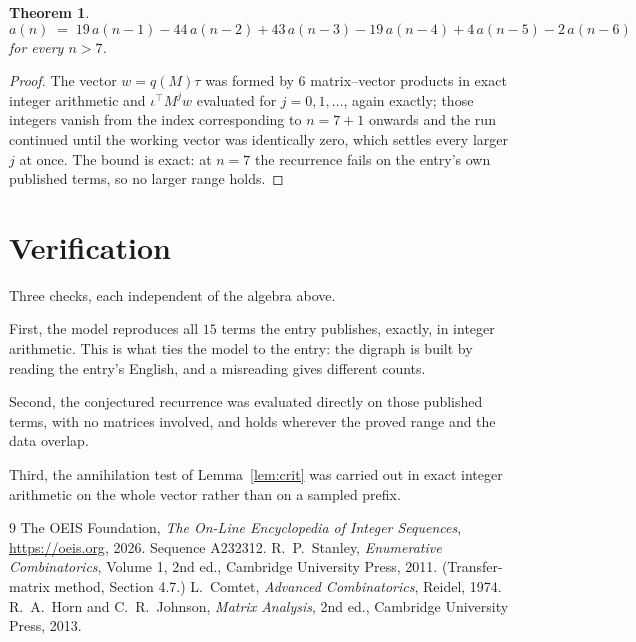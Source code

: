 \documentclass[11pt,a4paper]{article}
\theoremstyle{plain}
\newtheorem{theorem}{Theorem}
\theoremstyle{definition}
\begin{document}
\begin{theorem}
\[
a(n)\;=\;19\,a(n-1) - 44\,a(n-2) + 43\,a(n-3) - 19\,a(n-4) + 4\,a(n-5) - 2\,a(n-6)
\]
for every $n>7$.
\end{theorem}

\begin{proof}
The vector $w=q(M)\tau$ was formed by $6$ matrix--vector products in exact integer
arithmetic and $\iota^{\!\top}M^{j}w$ evaluated for $j=0,1,\dots$, again exactly; those
integers vanish from the index corresponding to $n=7+1$ onwards and the run continued
until the working vector was identically zero, which settles every larger $j$ at once. The bound is exact: at $n=7$ the recurrence fails on the entry's own published terms, so no larger range holds.
\end{proof}

\section{Verification}

Three checks, each independent of the algebra above.

First, the model reproduces all $15$ terms the entry publishes, exactly, in integer
arithmetic. This is what ties the model to the entry: the digraph is built by reading the
entry's English, and a misreading gives different counts.

Second, the conjectured recurrence was evaluated directly on those published terms, with no
matrices involved, and holds wherever the proved range and the data overlap.

Third, the annihilation test of Lemma~\ref{lem:crit} was carried out in exact integer
arithmetic on the whole vector rather than on a sampled prefix.

\begin{thebibliography}{9}
 The OEIS Foundation, \emph{The On-Line Encyclopedia of Integer
Sequences}, \url{https://oeis.org}, 2026. Sequence A232312.
 R.~P.~Stanley, \emph{Enumerative Combinatorics}, Volume 1, 2nd ed.,
Cambridge University Press, 2011. (Transfer-matrix method, Section 4.7.)
 L.~Comtet, \emph{Advanced Combinatorics}, Reidel, 1974.
 R.~A.~Horn and C.~R.~Johnson, \emph{Matrix Analysis}, 2nd ed., Cambridge
University Press, 2013.
\end{thebibliography}
\end{document}
